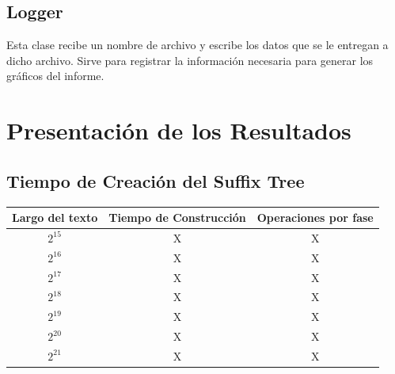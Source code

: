 \documentclass[letterpaper,10pt]{article}
\begin{document}
	\subsection{Logger}

	Esta clase recibe un nombre de archivo y escribe los datos que se le entregan a dicho archivo. Sirve para registrar la información necesaria para generar los gráficos del informe.

	\newpage

	\section{Presentación de los Resultados}

	\subsection{Tiempo de Creación del Suffix Tree}


	\begin{center}
		\begin{tabular}{|c|c|c|}
			\hline
			Largo del texto & Tiempo de Construcción & Operaciones por fase\\
			\hline
			$2^{15}$ & X & X\\
			\hline
			$2^{16}$ & X & X\\
			\hline
			$2^{17}$ & X & X\\
			\hline
			$2^{18}$ & X & X\\
			\hline
			$2^{19}$ & X & X\\
			\hline
			$2^{20}$ & X & X\\
			\hline
			$2^{21}$ & X & X\\
			\hline
		\end{tabular}
	\end{center}
\end{document}
